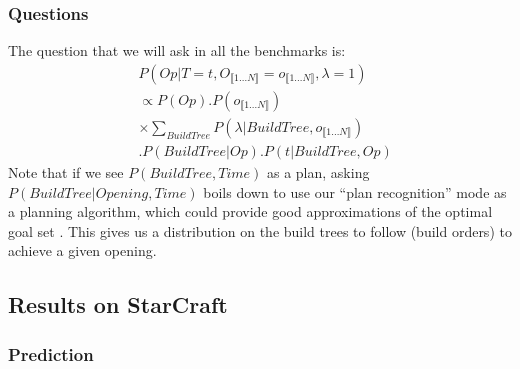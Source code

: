 \subsubsection{Questions}
The question that we will ask in all the benchmarks is:
\begin{eqnarray*}
 & P(Op|T=t, O_{\llbracket 1\dots N\rrbracket}=o_{\llbracket 1\dots N\rrbracket}, \lambda = 1) \\
 & \propto P(Op).P(o_{\llbracket 1\dots N\rrbracket})\\
 & \times \sum_{BuildTree} P(\lambda | BuildTree, o_{\llbracket 1\dots N\rrbracket})\\
 & .P(BuildTree|Op).P(t|BuildTree, Op)
\end{eqnarray*}
Note that if we see $P(BuildTree, Time)$ as a plan, asking $P(BuildTree|Opening, Time)$ boils down to use our ``plan recognition'' mode as a planning algorithm, which could provide good approximations of the optimal goal set \citep{Ramirez}. This gives us a distribution on the build trees to follow (build orders) to achieve a given opening.

\subsection{Results on StarCraft}

\subsubsection{Prediction}

